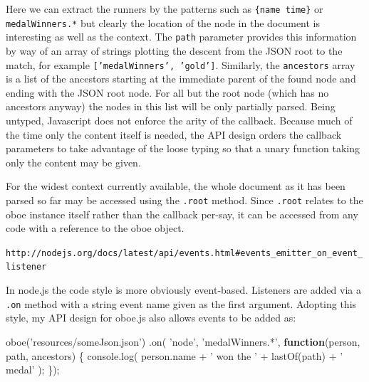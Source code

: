 \documentclass[]{article}
\newenvironment{Shaded}{}{}
\newcommand{\KeywordTok}[1]{\textcolor[rgb]{0.00,0.44,0.13}{\textbf{{#1}}}}
\newcommand{\StringTok}[1]{\textcolor[rgb]{0.25,0.44,0.63}{{#1}}}
\newcommand{\OtherTok}[1]{\textcolor[rgb]{0.00,0.44,0.13}{{#1}}}
\newcommand{\FunctionTok}[1]{\textcolor[rgb]{0.02,0.16,0.49}{{#1}}}
\newcommand{\NormalTok}[1]{{#1}}
\begin{document}
Here we can extract the runners by the patterns such as
\texttt{\{name time\}} or \texttt{medalWinners.*} but clearly the
location of the node in the document is interesting as well as the
context. The \texttt{path} parameter provides this information by way of
an array of strings plotting the descent from the JSON root to the
match, for example \texttt{{[}'medalWinners', 'gold'{]}}. Similarly, the
\texttt{ancestors} array is a list of the ancestors starting at the
immediate parent of the found node and ending with the JSON root node.
For all but the root node (which has no ancestors anyway) the nodes in
this list will be only partially parsed. Being untyped, Javascript does
not enforce the arity of the callback. Because much of the time only the
content itself is needed, the API design orders the callback parameters
to take advantage of the loose typing so that a unary function taking
only the content may be given.

For the widest context currently available, the whole document as it has
been parsed so far may be accessed using the \texttt{.root} method.
Since \texttt{.root} relates to the oboe instance itself rather than the
callback per-say, it can be accessed from any code with a reference to
the oboe object.

\texttt{http://nodejs.org/docs/latest/api/events.html\#events\_emitter\_on\_event\_listener}

In node.js the code style is more obviously event-based. Listeners are
added via a \texttt{.on} method with a string event name given as the
first argument. Adopting this style, my API design for oboe.js also
allows events to be added as:

\begin{Shaded}
\begin{Highlighting}[]
\FunctionTok{oboe}\NormalTok{(}\StringTok{'resources/someJson.json'}\NormalTok{)}
   \NormalTok{.}\FunctionTok{on}\NormalTok{( }\StringTok{'node'}\NormalTok{, }\StringTok{'medalWinners.*'}\NormalTok{, }\KeywordTok{function}\NormalTok{(person, path, ancestors) \{}
      \OtherTok{console}\NormalTok{.}\FunctionTok{log}\NormalTok{( }\OtherTok{person}\NormalTok{.}\FunctionTok{name} \NormalTok{+ }\StringTok{' won the '} \NormalTok{+ }\FunctionTok{lastOf}\NormalTok{(path) + }\StringTok{' medal'} \NormalTok{);}
   \NormalTok{\});}
\end{Highlighting}
\end{Shaded}
\end{document}
